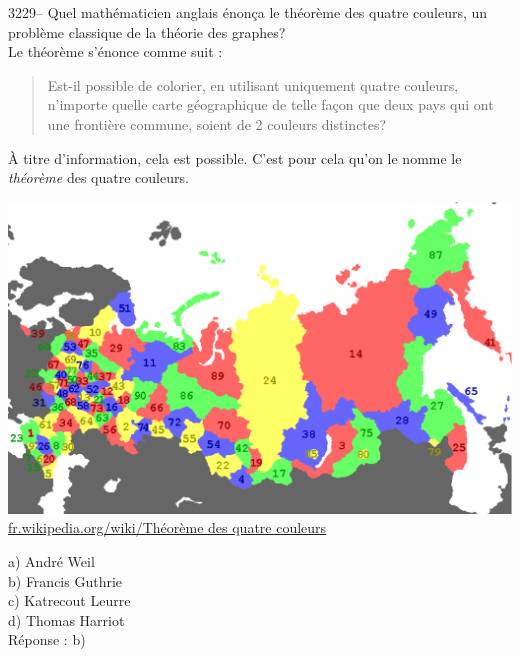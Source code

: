 \documentclass[letterpaper, 12pt]{article}
\begin{document}
3229-- Quel math\'ematicien anglais \'enon\c ca le th\'eor\`eme des quatre couleurs, un probl\`eme classique de la th\'eorie des graphes?\\
Le th\'eor\`eme s'\'enonce comme suit :\\
\begin{quote}
Est-il possible de colorier, en utilisant uniquement quatre couleurs, n'importe quelle carte g\'eographique de telle fa\c con que deux pays qui ont une fronti\`ere commune, soient de 2 couleurs distinctes?\\
\end{quote}
\`A titre d'information, cela est possible. C'est pour cela qu'on le nomme le \emph{th\'eor\`eme} des quatre couleurs.
\begin{center}
\includegraphics[scale=0.65]{prob4coul.eps}
\href{http://fr.wikipedia.org/wiki/Th\%C3\%A9or\%C3\%A8me_des_quatre_couleurs}{fr.wikipedia.org/wiki/Th\'eor\`eme des quatre couleurs}\\[5mm]
\end{center}

a) Andr\'e Weil\\
b) Francis Guthrie\\
c) Katrecout Leurre\\
d) Thomas Harriot\\

R\'eponse : b)\\
\end{document}
